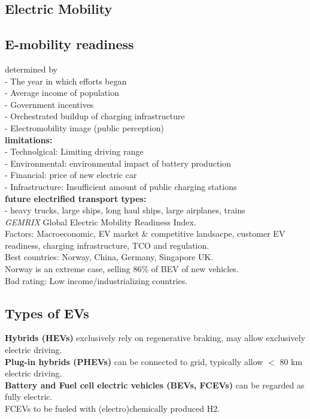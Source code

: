 \documentclass[a4paper,10pt,landscape]{scrartcl}
\begin{document}
\begin{multicols*}{3}
\section{Electric Mobility}
\subsection{E-mobility readiness}
determined by \\
- The year in which efforts began \\
- Average income of population \\
- Government incentives \\
- Orchestrated buildup of charging infrastructure \\
- Electromobility image (public perception) \\
\textbf{limitations:} \\
- Technolgical: Limiting driving range \\
- Environmental: environmental impact of battery production \\
- Financial: price of new electric car \\
- Infrastructure: Insufficient amount of public charging stations \\
\textbf{future electrified transport types:} \\
- heavy trucks, large ships, long haul ships, large airplanes, trains \\
\textit{GEMRIX}
Global Electric Mobility Readiness Index. \\
Factors: Macroeconomic, EV market \& competitive landsacpe, customer EV readiness, charging infrastructure, TCO and regulation. \\
Best countries: Norway, China, Germany, Singapore UK. \\
Norway is an extreme case, selling 86\% of BEV of new vehicles. \\
Bad rating: Low income/industrializing countries. \\
\subsection{Types of EVs}
\textbf{Hybrids (HEVs)} exclusively rely on regenerative braking, may allow exclusively electric driving. \\
\textbf{Plug-in hybrids (PHEVs)} can be connected to grid, typically allow $<$ 80 km electric driving. \\
\textbf{Battery and Fuel cell electric vehicles (BEVs, FCEVs)} can be regarded as fully electric. \\
FCEVs to be fueled with (electro)chemically produced H2.

\end{multicols*}
\end{document}

